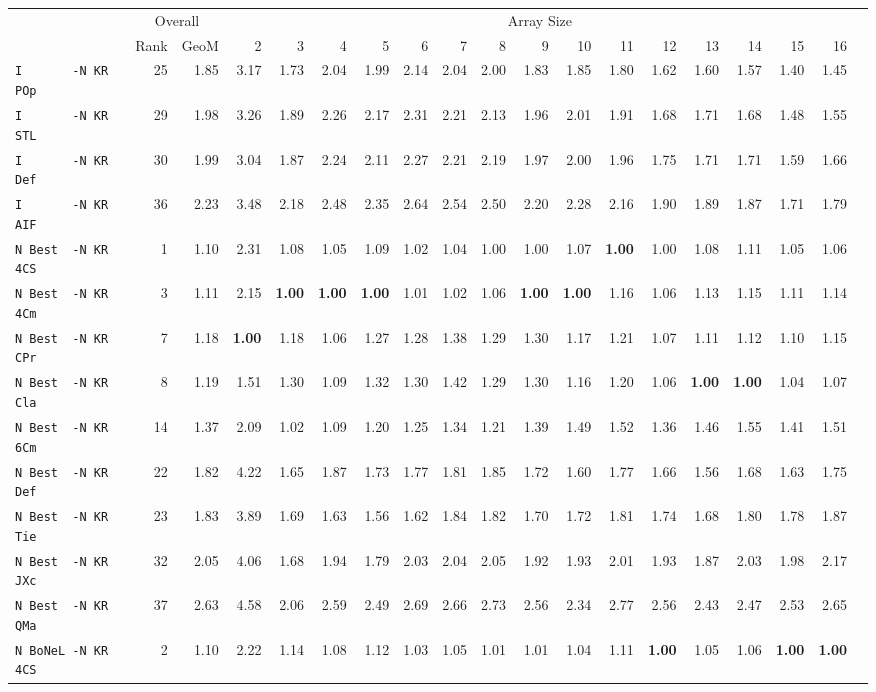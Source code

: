 \begin{tabular}{l | r @{~~} r | r@{~~}r@{~~}r@{~~}r@{~~}r@{~~}r@{~~}r@{~~}r@{~~}r@{~~}r@{~~}r@{~~}r@{~~}r@{~~}r@{~~}r@{~~}r|}
 & \multicolumn{2}{c|}{Overall} & \multicolumn{15}{c}{Array Size} \\
 & Rank & GeoM & 2&3&4&5&6&7&8&9&10&11&12&13&14&15&16\\ \hline
\verb+I       -N KR POp+ & 25 & 1.85 & 3.17&1.73&2.04&1.99&2.14&2.04&2.00&1.83&1.85&1.80&1.62&1.60&1.57&1.40&1.45\\
\verb+I       -N KR STL+ & 29 & 1.98 & 3.26&1.89&2.26&2.17&2.31&2.21&2.13&1.96&2.01&1.91&1.68&1.71&1.68&1.48&1.55\\
\verb+I       -N KR Def+ & 30 & 1.99 & 3.04&1.87&2.24&2.11&2.27&2.21&2.19&1.97&2.00&1.96&1.75&1.71&1.71&1.59&1.66\\
\verb+I       -N KR AIF+ & 36 & 2.23 & 3.48&2.18&2.48&2.35&2.64&2.54&2.50&2.20&2.28&2.16&1.90&1.89&1.87&1.71&1.79\smallskip \\
\verb+N Best  -N KR 4CS+ & 1 & 1.10 & 2.31&1.08&1.05&1.09&1.02&1.04&1.00&1.00&1.07&\textbf{1.00}&1.00&1.08&1.11&1.05&1.06\\
\verb+N Best  -N KR 4Cm+ & 3 & 1.11 & 2.15&\textbf{1.00}&\textbf{1.00}&\textbf{1.00}&1.01&1.02&1.06&\textbf{1.00}&\textbf{1.00}&1.16&1.06&1.13&1.15&1.11&1.14\\
\verb+N Best  -N KR CPr+ & 7 & 1.18 & \textbf{1.00}&1.18&1.06&1.27&1.28&1.38&1.29&1.30&1.17&1.21&1.07&1.11&1.12&1.10&1.15\\
\verb+N Best  -N KR Cla+ & 8 & 1.19 & 1.51&1.30&1.09&1.32&1.30&1.42&1.29&1.30&1.16&1.20&1.06&\textbf{1.00}&\textbf{1.00}&1.04&1.07\\
\verb+N Best  -N KR 6Cm+ & 14 & 1.37 & 2.09&1.02&1.09&1.20&1.25&1.34&1.21&1.39&1.49&1.52&1.36&1.46&1.55&1.41&1.51\\
\verb+N Best  -N KR Def+ & 22 & 1.82 & 4.22&1.65&1.87&1.73&1.77&1.81&1.85&1.72&1.60&1.77&1.66&1.56&1.68&1.63&1.75\\
\verb+N Best  -N KR Tie+ & 23 & 1.83 & 3.89&1.69&1.63&1.56&1.62&1.84&1.82&1.70&1.72&1.81&1.74&1.68&1.80&1.78&1.87\\
\verb+N Best  -N KR JXc+ & 32 & 2.05 & 4.06&1.68&1.94&1.79&2.03&2.04&2.05&1.92&1.93&2.01&1.93&1.87&2.03&1.98&2.17\\
\verb+N Best  -N KR QMa+ & 37 & 2.63 & 4.58&2.06&2.59&2.49&2.69&2.66&2.73&2.56&2.34&2.77&2.56&2.43&2.47&2.53&2.65\smallskip \\
\verb+N BoNeL -N KR 4CS+ & 2 & 1.10 & 2.22&1.14&1.08&1.12&1.03&1.05&1.01&1.01&1.04&1.11&\textbf{1.00}&1.05&1.06&\textbf{1.00}&\textbf{1.00}\\

\end{tabular}
